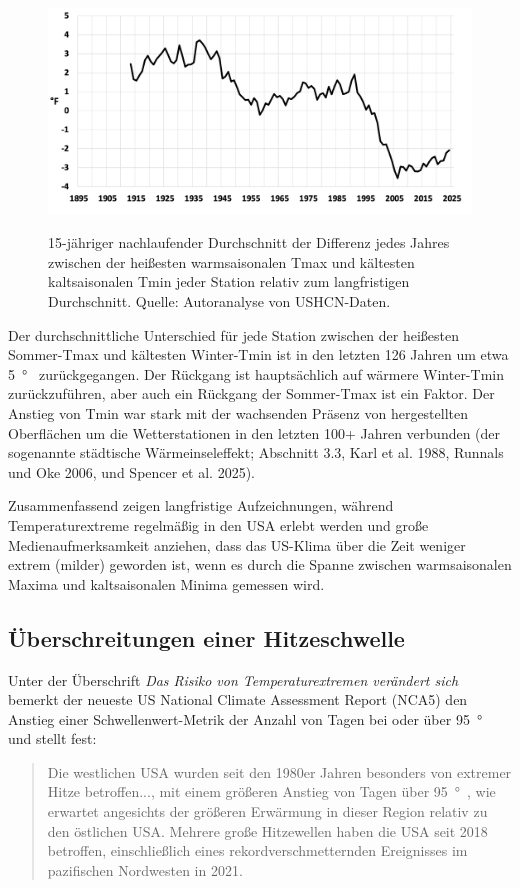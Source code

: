 \documentclass[12pt,paper=a4,DIV=12,parskip=never,chapterprefix=false,headings=standardclasses]{scrreprt}
\begin{document}
\begin{figure}[H]
\begin{center}
\includegraphics[width=1.0\textwidth]{bilder/bilderKlima-0045.png}\\[1cm]
\end{center}
\caption{15-jähriger nachlaufender Durchschnitt der Differenz jedes Jahres zwischen der heißesten warmsaisonalen Tmax und kältesten kaltsaisonalen Tmin jeder Station relativ zum langfristigen Durchschnitt. Quelle: Autoranalyse von USHCN-Daten.}
\end{figure}

Der durchschnittliche Unterschied für jede Station zwischen der heißesten Sommer-Tmax und kältesten Winter-Tmin ist in den letzten 126 Jahren um etwa \SI{5}{\degree{}} zurückgegangen. Der Rückgang ist hauptsächlich auf wärmere Winter-Tmin zurückzuführen, aber auch ein Rückgang der Sommer-Tmax ist ein Faktor. Der Anstieg von Tmin war stark mit der wachsenden Präsenz von hergestellten Oberflächen um die Wetterstationen in den letzten 100+ Jahren verbunden (der sogenannte städtische Wärmeinseleffekt; Abschnitt 3.3, Karl et al. 1988, Runnals und Oke 2006, und Spencer et al. 2025).

Zusammenfassend zeigen langfristige Aufzeichnungen, während Temperaturextreme regelmäßig in den USA erlebt werden und große Medienaufmerksamkeit anziehen, dass das US-Klima über die Zeit weniger extrem (milder) geworden ist, wenn es durch die Spanne zwischen warmsaisonalen Maxima und kaltsaisonalen Minima gemessen wird.

\subsection{Überschreitungen einer Hitzeschwelle}
Unter der Überschrift \emph{Das Risiko von Temperaturextremen verändert sich} bemerkt der neueste US National Climate Assessment Report (NCA5) den Anstieg einer Schwellenwert-Metrik der Anzahl von Tagen bei oder über \SI{95}{\degree{}} und stellt fest:
\begin{quote}
Die westlichen USA wurden seit den 1980er Jahren besonders von extremer Hitze betroffen..., mit einem größeren Anstieg von Tagen über \SI{95}{\degree{}}, wie erwartet angesichts der größeren Erwärmung in dieser Region relativ zu den östlichen USA. Mehrere große Hitzewellen haben die USA seit 2018 betroffen, einschließlich eines rekordverschmetternden Ereignisses im pazifischen Nordwesten in 2021.
\end{quote}
\end{document}
